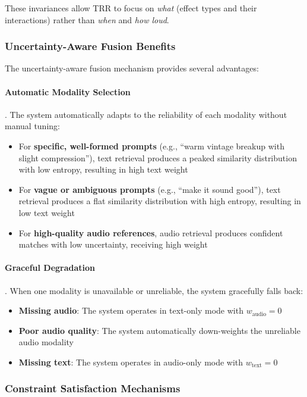 These invariances allow TRR to focus on \textit{what} (effect types and their interactions) rather than \textit{when} and \textit{how loud}.

\subsubsection{Uncertainty-Aware Fusion Benefits}

The uncertainty-aware fusion mechanism provides several advantages:

\paragraph{Automatic Modality Selection}. The system automatically adapts to the reliability of each modality without manual tuning:
\begin{itemize}
	\item For \textbf{specific, well-formed prompts} (e.g., ``warm vintage breakup with slight compression''), text retrieval produces a peaked similarity distribution with low entropy, resulting in high text weight
	\item For \textbf{vague or ambiguous prompts} (e.g., ``make it sound good''), text retrieval produces a flat similarity distribution with high entropy, resulting in low text weight
	\item For \textbf{high-quality audio references}, audio retrieval produces confident matches with low uncertainty, receiving high weight
\end{itemize}

\paragraph{Graceful Degradation}. When one modality is unavailable or unreliable, the system gracefully falls back:
\begin{itemize}
	\item \textbf{Missing audio}: The system operates in text-only mode with $w_{\text{audio}} = 0$
	\item \textbf{Poor audio quality}: The system automatically down-weights the unreliable audio modality
	\item \textbf{Missing text}: The system operates in audio-only mode with $w_{\text{text}} = 0$
\end{itemize}

\subsubsection{Constraint Satisfaction Mechanisms}

